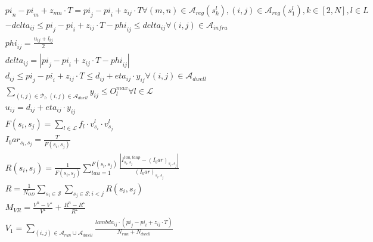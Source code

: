 \begin{align}
  & \mathit{pi}_{n} - \mathit{pi}_{m} + z_{m n} \cdot T = \mathit{pi}_{j} - \mathit{pi}_{i} + z_{i j} \cdot T \forall \left(m , n\right) \in \mathbf{\mathcal{A}}_{reg} \left(s_{k}^{l}\right) , \left(i , j\right) \in \mathbf{\mathcal{A}}_{reg} \left(s_{1}^{l}\right) , k \in \left[2 , N\right] , l \in L \tag{eq\_0022} \\
  & - \mathit{delta}_{i j} \leq \mathit{pi}_{j} - \mathit{pi}_{i} + z_{i j} \cdot T - \mathit{phi}_{i j} \leq \mathit{delta}_{i j} \forall \left(i , j\right) \in \mathbf{\mathcal{A}}_{infra} \tag{eq\_0023} \\
  & \mathit{phi}_{i j} = \frac{u_{i j} + l_{i j}}{2} \tag{eq\_0024} \\
  & \mathit{delta}_{i j} = \left|\mathit{pi}_{j} - \mathit{pi}_{i} + z_{i j} \cdot T - \mathit{phi}_{i j}\right| \tag{eq\_0025} \\
  & d_{i j} \leq \mathit{pi}_{j} - \mathit{pi}_{i} + z_{i j} \cdot T \leq d_{i j} + \mathit{eta}_{i j} \cdot y_{i j} \forall \left(i , j\right) \in \mathbf{\mathcal{A}}_{dwell} \tag{eq\_0026} \\
  & \underset{\left(i , j\right) \in \mathbf{\mathcal{P}}_{l} , \left(i , j\right) \in \mathbf{\mathcal{A}}_{dwell}}{\sum} y_{i j} \leq O_{l}^{m a x} \forall l \in \mathbf{\mathcal{L}} \tag{eq\_0027} \\
  & u_{i j} = d_{i j} + \mathit{eta}_{i j} \cdot y_{i j} \tag{eq\_0028} \\
  & F \left(s_{i} , s_{j}\right) = \underset{l \in \mathbf{\mathcal{L}}}{\sum} f_{l} \cdot v_{s_{i}}^{l} \cdot v_{s_{j}}^{l} \tag{eq\_0031} \\
  & I_bar_{s_{i} , s_{j}} = \frac{T}{F \left(s_{i} , s_{j}\right)} \tag{eq\_0032} \\
  & R \left(s_{i} , s_{j}\right) = \frac{1}{F \left(s_{i} , s_{j}\right)} \sum_{\mathit{tau} = 1}^{F \left(s_{i} , s_{j}\right)} \frac{\left|\right. I_{s_{i} , s_{j}}^{\mathit{tau} , taup} - \left(I_bar\right)_{s_{i} , s_{j}} \left|\right.}{\left(I_bar\right)_{s_{i} , s_{j}}} \tag{eq\_0033} \\
  & R = \frac{1}{N_{O D}} \underset{s_{i} \in \mathbf{\mathcal{S}}}{\sum} \underset{s_{j} \in \mathbf{\mathcal{S}} : i < j}{\sum} R \left(s_{i} , s_{j}\right) \tag{eq\_0034} \\
  & M_{V R} = \frac{V^{n} - V^{\star}}{V^{\star}} + \frac{R^{n} - R^{\star}}{R^{\star}} \tag{eq\_0035} \\
  & V_{1} = \underset{\left(i , j\right) \in \mathbf{\mathcal{A}}_{run} \cup \mathbf{\mathcal{A}}_{dwell}}{\sum} \frac{\mathit{lambda}_{i j} \cdot \left(\mathit{pi}_{j} - \mathit{pi}_{i} + z_{i j} \cdot T\right)}{N_{run} + N_{dwell}} \tag{eq\_0037} \\

\end{align}
